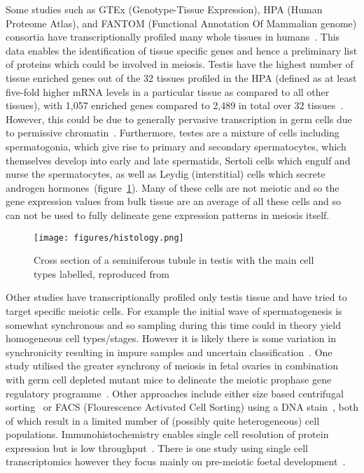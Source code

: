Some studies such as GTEx (Genotype-Tissue Expression), HPA (Human Proteome Atlas), and FANTOM (Functional Annotation Of Mammalian genome) consortia have transcriptionally profiled many whole tissues in humans~\cite{Mele2015Human,Uhlen2015Tissuebased,Uhlen2016Transcriptomics}. This data enables the identification of tissue specific genes and hence a preliminary list of proteins which could be involved in meiosis. Testis have the highest number of tissue enriched genes out of the 32 tissues profiled in the HPA (defined as at least five-fold higher mRNA levels in a particular tissue as compared to all other tissues), with 1,057 enriched genes compared to 2,489 in total over 32 tissues~\cite{Atlashuman}. However, this could be due to generally pervasive transcription in germ cells due to permissive chromatin~\cite{Soumillon2013Cellular}. Furthermore, testes are a mixture of cells including spermatogonia, which give rise to primary and secondary spermatocytes, which themselves develop into early and late spermatids, Sertoli cells which engulf and nurse the spermatocytes, as well as Leydig (interstitial) cells which secrete androgen hormones~(figure~\ref{fig:histology}). Many of these cells are not meiotic and so the gene expression values from bulk tissue are an average of all these cells and so can not be used to fully delineate gene expression patterns in meiosis itself.

\begin{figure}[H]
	\centering
	\texttt{[image: figures/histology.png]}
	\caption{Cross section of a seminiferous tubule in testis with the main cell types labelled, reproduced from~\cite{Junqueira2005Basic}}
	\label{fig:histology}
\end{figure}

Other studies have transcriptionally profiled only testis tissue and have tried to target specific meiotic cells. For example the initial wave of spermatogenesis is somewhat synchronous and so sampling during this time could in theory yield homogeneous cell types/stages. However it is likely there is some variation in synchronicity resulting in impure samples and uncertain classification~\cite{Laiho2013Transcriptome,Ball2016Regulatory}. One study utilised the greater synchrony of meiosis in fetal ovaries in combination with germ cell depleted mutant mice to delineate the meiotic prophase gene regulatory programme~\cite{Soh2015Gene}. Other approaches include either size based centrifugal sorting~\cite{Soumillon2013Cellular,Buard2009Distinct,Grabske1975Centrifugal} or FACS (Flourescence Activated Cell Sorting) using a DNA stain~\cite{daCruz2016Transcriptome}, both of which result in a limited number of (possibly quite heterogeneous) cell populations. Immunohistochemistry enables single cell resolution of protein expression but is low throughput~\cite{Djureinovic2014human}. There is one study using single cell transcriptomics however they focus mainly on pre-meiotic foetal development~\cite{Li2017SingleCell}.

